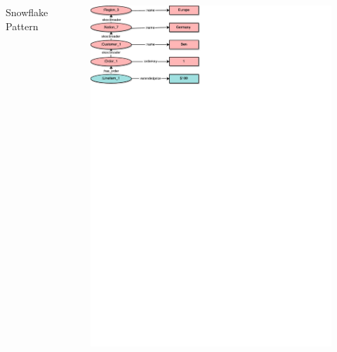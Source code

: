 \section{\patsec}
\begin{frame}{\patsec}
    \begin{columns}
        Snowflake Pattern
        \begin{figure}
            \includegraphics[trim=0 648 325 0,clip,width=0.5\textheight]{images/snowflakepattern.pdf}
        \end{figure}


\end{columns}
\end{frame}
